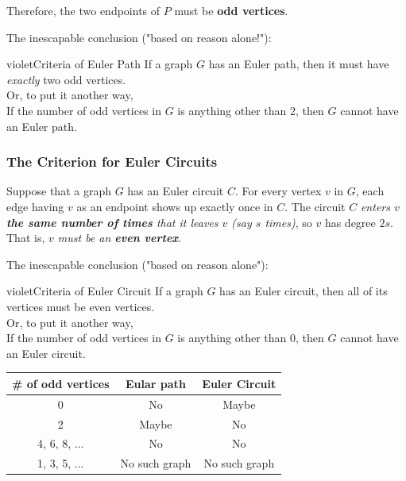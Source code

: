 \documentclass[11pt]{article}
\begin{document}
Therefore, the two endpoints of $P$ must be \textbf{odd vertices}.

The inescapable conclusion ("based on reason alone!"):
\begin{mybox}{violet}{Criteria of Euler Path}
If a graph $G$ has an Euler path, then it must have \textit{exactly} two odd vertices.\\

Or, to put it another way,\\

If the number of odd vertices in $G$ is anything other than 2, then $G$ cannot have an Euler path.
\end{mybox}

\subsubsection{The Criterion for Euler Circuits}

Suppose that a graph $G$ has an Euler circuit $C$. For every vertex $v$ in $G$, each edge having $v$ as an endpoint shows up exactly once in $C$. The circuit $C$ \textit{enters $v$ \textbf{the same number of times} that it
leaves $v$ (say $s$ times)}, so $v$ has degree $2s$. That is, \textit{$v$ must be an \textbf{even vertex}.}

The inescapable conclusion ("based on reason alone"):
\begin{mybox}{violet}{Criteria of Euler Circuit}
If a graph $G$ has an Euler circuit, then all of its vertices must be even vertices.\\

Or, to put it another way,\\

If the number of odd vertices in $G$ is anything other than 0, then $G$ cannot have an Euler circuit.
\end{mybox}

\begin{table}[h!]
    \centering
    \begin{tabular}{|c|c|c|}
        \hline
        \# of odd vertices & Eular path & Euler Circuit \\ \hline
        0 & No & Maybe \\ \hline
        2 & Maybe & No \\ \hline
        4, 6, 8, ... & No & No \\ \hline
        1, 3, 5, ... & No such graph & No such graph \\ \hline
    \end{tabular}
\end{table}
\end{document}
